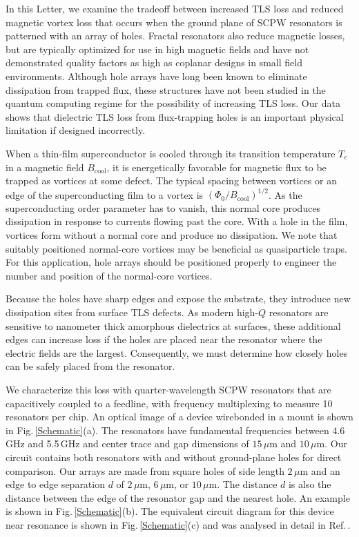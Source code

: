 \documentclass[aip,jap,reprint,nobalancelastpage]{revtex4-1}
\begin{document}
In this Letter, we examine the tradeoff between increased TLS loss and reduced magnetic vortex loss that occurs when the ground plane of SCPW resonators is patterned with an array of holes.  Fractal resonators also reduce magnetic losses, but are typically optimized for use in high magnetic fields and have not demonstrated quality factors as high as coplanar designs in small field environments.\cite{graaf2012}  Although hole arrays have long been known to eliminate dissipation from trapped flux, \cite{song2009b, bothner2011, bothner2012} these structures have not been studied in the quantum computing regime for the possibility of increasing TLS loss. Our data shows that dielectric TLS loss from flux-trapping holes is an important physical limitation if designed incorrectly.   

When a thin-film superconductor is cooled through its transition temperature $T_c$ in a magnetic field $B_{\textrm{cool}}$, it is energetically favorable for magnetic flux to be trapped as vortices at some defect\cite{stan2004}.  The typical spacing between vortices or an edge of the superconducting film to a vortex is $\left( \Phi_{0} / B_{\textrm{cool}} \right)^{1/2}$. As the superconducting order parameter has to vanish\cite{tinkham}, this normal core produces dissipation in response to currents flowing past the core\cite{song2009a}.  With a hole in the film, vortices form without a normal core and produce no dissipation.  We note that suitably positioned normal-core vortices may be beneficial as quasiparticle traps\cite{nsanzineza2014,wang2014}.  For this application, hole arrays should be positioned properly to engineer the number and position of the normal-core vortices. 

Because the holes have sharp edges and expose the substrate, they introduce new dissipation sites from surface TLS defects.  As modern high-$Q$ resonators are sensitive to  nanometer thick amorphous dielectrics at surfaces\cite{wenner2011}, these additional edges can increase loss if the holes are placed near the resonator where the electric fields are the largest.  Consequently, we must determine how closely holes can be safely placed from the resonator.

We characterize this loss with quarter-wavelength SCPW resonators that are capacitively coupled to a feedline, with frequency multiplexing to measure 10 resonators per chip.  An optical image of a device wirebonded in a mount is shown in Fig.\,\ref{Schematic}(a). The resonators have fundamental frequencies between 4.6\,GHz and 5.5\,GHz and center trace and gap dimensions of $15\,\mu\text{m}$ and $10\,\mu\text{m}$.  Our circuit contains both resonators with and without ground-plane holes for direct comparison.  Our arrays are made from square holes of side length $2\,\mu\text{m}$ and an edge to edge separation $d$ of $2\,\mu \text{m}$, $6\,\mu \text{m}$, or $10\,\mu \text{m}$.  The distance $d$ is also the distance between the edge of the resonator gap and the nearest hole.\cite{chiaro2015supp}  An example is shown in Fig.\,\ref{Schematic}(b).  The equivalent circuit diagram for this device near resonance is shown in Fig.\,\ref{Schematic}(c) and was analysed in detail in Ref.\,.
\end{document}
